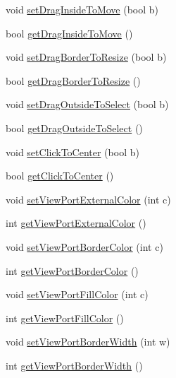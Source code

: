 \begin{DoxyCompactItemize}
\item 
void \hyperlink{class_view_port_control_base_a2e7a90ee53e46b85903aaad61c84fc60}{set\+Drag\+Inside\+To\+Move} (bool b)
\item 
bool \hyperlink{class_view_port_control_base_a60ce33b7ae39dbc6892f31c0f389d91a}{get\+Drag\+Inside\+To\+Move} ()
\item 
void \hyperlink{class_view_port_control_base_af492092d7a8e4c9ae02d8db6d0d56611}{set\+Drag\+Border\+To\+Resize} (bool b)
\item 
bool \hyperlink{class_view_port_control_base_a228f5f69f5a4185aa29c64336e71e47a}{get\+Drag\+Border\+To\+Resize} ()
\item 
void \hyperlink{class_view_port_control_base_a6cab98dc7bd59b494ad9fb45dd84d26e}{set\+Drag\+Outside\+To\+Select} (bool b)
\item 
bool \hyperlink{class_view_port_control_base_a642468794fd458edc3e06fc4cc8f9a5e}{get\+Drag\+Outside\+To\+Select} ()
\item 
void \hyperlink{class_view_port_control_base_a0b578dd9d9d66b882d616ed159a75fd0}{set\+Click\+To\+Center} (bool b)
\item 
bool \hyperlink{class_view_port_control_base_aa225357b608db40d01ed75bb3f0ffc3e}{get\+Click\+To\+Center} ()
\item 
void \hyperlink{class_view_port_control_base_a3d00840e391a598f1eff6eb62208cbfd}{set\+View\+Port\+External\+Color} (int c)
\item 
int \hyperlink{class_view_port_control_base_ac55d048e9b344c04338db5ba2e4e6527}{get\+View\+Port\+External\+Color} ()
\item 
void \hyperlink{class_view_port_control_base_a309fc96ef2d9749ba580642bf43e9e4d}{set\+View\+Port\+Border\+Color} (int c)
\item 
int \hyperlink{class_view_port_control_base_ad8ec0a208a064592f84336ba414687df}{get\+View\+Port\+Border\+Color} ()
\item 
void \hyperlink{class_view_port_control_base_a4d0c34e2b62bc5d22259ee4db97a1a37}{set\+View\+Port\+Fill\+Color} (int c)
\item 
int \hyperlink{class_view_port_control_base_af024de68b7ea4106c825e5da80588b27}{get\+View\+Port\+Fill\+Color} ()
\item 
void \hyperlink{class_view_port_control_base_a7122f0aa68a560d300e3edaa5569a47f}{set\+View\+Port\+Border\+Width} (int w)
\item 
int \hyperlink{class_view_port_control_base_a41dc7a24fc0d442e387de36a850add29}{get\+View\+Port\+Border\+Width} ()

\end{DoxyCompactItemize}
